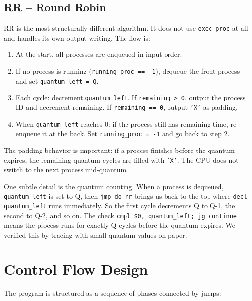 \documentclass[a4paper,12pt]{article}
\begin{document}
\subsection{RR -- Round Robin}

RR is the most structurally different algorithm. It does not use \texttt{exec\_proc} at all and handles its own output writing. The flow is:

\begin{enumerate}
    \item At the start, all processes are enqueued in input order.
    \item If no process is running (\texttt{running\_proc == -1}), dequeue the front process and set \texttt{quantum\_left = Q}.
    \item Each cycle: decrement \texttt{quantum\_left}. If \texttt{remaining > 0}, output the process ID and decrement remaining. If \texttt{remaining == 0}, output \texttt{'X'} as padding.
    \item When \texttt{quantum\_left} reaches 0: if the process still has remaining time, re-enqueue it at the back. Set \texttt{running\_proc = -1} and go back to step 2.
\end{enumerate}

The padding behavior is important: if a process finishes before the quantum expires, the remaining quantum cycles are filled with \texttt{'X'}. The CPU does not switch to the next process mid-quantum.

One subtle detail is the quantum counting. When a process is dequeued, \texttt{quantum\_left} is set to Q, then \texttt{jmp do\_rr} brings us back to the top where \texttt{decl quantum\_left} runs immediately. So the first cycle decrements Q to Q-1, the second to Q-2, and so on. The check \texttt{cmpl \$0, quantum\_left; jg continue} means the process runs for exactly Q cycles before the quantum expires. We verified this by tracing with small quantum values on paper.

\section{Control Flow Design}

The program is structured as a sequence of phases connected by jumps:
\end{document}
